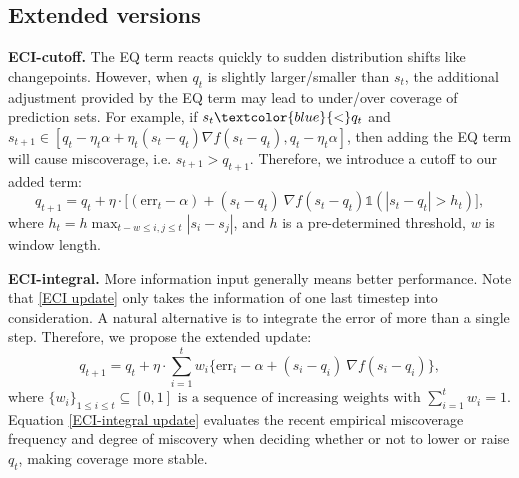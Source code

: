 





\subsection{Extended versions}
\vspace{-0.25em}
\textbf{ECI-cutoff.}
The EQ term reacts quickly to sudden distribution shifts like changepoints. However, when $q_t$ is slightly larger/smaller than $s_t$, the additional adjustment provided by the EQ term may lead to under/over coverage of prediction sets. For example, if $s_t \textcolor{blue}{<} q_t$ and $s_{t+1} \in \left[q_t-\eta_t\alpha+\eta_t(s_t-q_t) \nabla f(s_t-q_t) ,q_t-\eta_t \alpha \right]$, then adding the EQ term will cause miscoverage, i.e. $s_{t+1}>q_{t+1}$. Therefore, we introduce a cutoff to our added term: 
\begin{equation}
    q_{t+1} = q_t + \eta \cdot \bigg[(\text{err}_t - \alpha) + (s_t-q_t)\ \nabla f(s_t-q_t) \mathds{1}(|s_t-q_t| > h_t)\bigg],
    \label{ECI-cutoff update}
\end{equation}
where $h_t=h\max_{t-w\leq i,j \leq t}|s_i-s_j|$, and $h$ is a pre-determined threshold, $w$ is window length.

\textbf{ECI-integral.}
More information input generally means better performance. Note that \eqref{ECI update} only takes the information of one last timestep into consideration. A natural alternative is to integrate the error of more than a single step. Therefore, we propose the extended update:
\begin{equation}
    q_{t+1} = q_t + \eta \cdot \sum_{i=1}^t w_i\bigg\{\text{err}_i - \alpha+ (s_i-q_i)\ \nabla f(s_i-q_i)\bigg\},
    \label{ECI-integral update}
\end{equation}
where $\{w_i\}_{1\leq i\leq t}\subseteq[0,1]\text{ is a sequence of increasing weights with }\sum_{i=1}^tw_i=1.$
Equation \eqref{ECI-integral  update} evaluates the recent empirical miscoverage frequency and degree of miscovery when deciding whether or not to lower or raise $q_t$, making coverage more stable. 



